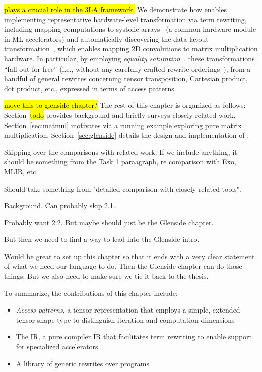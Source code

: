 \g \hl{
 plays a crucial role in the 3LA framework.
}
We demonstrate how \g
  enables implementing representative
  hardware-level transformation via term rewriting,
  including mapping computations
  to systolic arrays~\cite{jouppi2017tpu}
  (a common hardware module in ML accelerators)
  and automatically discovering the
   data layout transformation~\cite{im2col},
  which enables mapping 2D convolutions
  to matrix multiplication hardware.
In particular,
  by employing \textit{equality saturation}~\cite{willsey2021egg},
  these transformations ``fall out for free''
  (i.e., without any carefully crafted
  rewrite orderings~\cite{phase-ordering}),
  from a handful of general rewrites concerning tensor
  transposition, Cartesian product, dot product, etc.,
  expressed in terms of access patterns.


\hl{move this to glenside chapter?}
 The rest of this chapter is organized as follows:
Section~\hl{todo} provides background
  and briefly surveys closely related work.
Section~\ref{sec:matmul} motivates
  \g via a running example exploring
  pure matrix multiplication.
Section~\ref{sec:glenside} details the
  design and implementation of \g.


Skipping over the comparisons with related work.
If we include anything, it should be something
  from the Task 1 paraagraph, re comparison with Exo, MLIR, etc.

Should take something from "detailed comparison
  with closely related tools".

Background. Can probably skip 2.1.

Probably want 2.2. But maybe should just be the Glenside chapter.

But then we need to find a way
  to lead into the Glenside intro.

Would be great to set up this chapter
  so that it ends with a very clear statement
  of what we need our language to do.
Then the Glenside chapter can do those things.
But we also need to make sure
  we tie it back to the thesis.


  To summarize, the contributions of this chapter include:
\begin{itemize}
\item \textit{Access patterns},
  a tensor representation that employs a
  simple, extended tensor shape type to
  distinguish iteration and computation dimensions

\item The \g IR,
  a pure compiler IR that facilitates 
  term rewriting to enable support for
  specialized accelerators
  
\item A library of generic rewrites over \g programs
  
\end{itemize}



